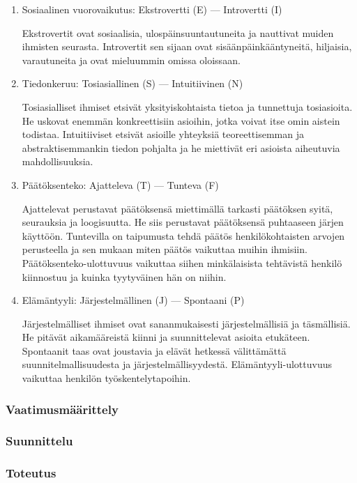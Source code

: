 \documentclass[finnish]{../tktltiki2}
\theoremstyle{definition}
\theoremstyle{remark}
\begin{document}
\begin{enumerate}

\item Sosiaalinen vuorovaikutus: Ekstrovertti (E) --- Introvertti (I)

Ekstrovertit ovat sosiaalisia, ulospäinsuuntautuneita ja nauttivat
muiden ihmisten seurasta. Introvertit sen sijaan ovat sisäänpäinkääntyneitä, hiljaisia, varautuneita ja ovat mieluummin omissa oloissaan.

\item Tiedonkeruu: Tosiasiallinen (S) --- Intuitiivinen (N)

Tosiasialliset ihmiset etsivät yksityiskohtaista tietoa ja tunnettuja
tosiasioita. He uskovat enemmän konkreettisiin asioihin, jotka
voivat itse omin aistein todistaa. Intuitiiviset etsivät asioille
yhteyksiä teoreettisemman ja abstraktisemmankin tiedon pohjalta ja
he miettivät eri asioista aiheutuvia mahdollisuuksia.

\item Päätöksenteko: Ajatteleva (T) --- Tunteva (F)

Ajattelevat perustavat päätöksensä miettimällä tarkasti päätöksen syitä, seurauksia ja loogisuutta. He siis perustavat päätöksensä puhtaaseen järjen käyttöön. Tuntevilla on taipumusta tehdä päätös
henkilökohtaisten arvojen perusteella ja sen mukaan miten päätös
vaikuttaa muihin ihmisiin. Päätöksenteko-ulottuvuus vaikuttaa siihen minkälaisista tehtävistä
henkilö kiinnostuu ja kuinka tyytyväinen hän on niihin.

\item Elämäntyyli: Järjestelmällinen (J) --- Spontaani (P)

Järjestelmälliset ihmiset ovat sananmukaisesti järjestelmällisiä
ja täsmällisiä. He pitävät aikamääreistä kiinni ja suunnittelevat
asioita etukäteen. Spontaanit taas ovat joustavia ja elävät
hetkessä välittämättä suunnitelmallisuudesta ja järjestelmällisyydestä.
Elämäntyyli-ulottuvuus vaikuttaa henkilön työskentelytapoihin.

\end{enumerate}

\subsubsection{Vaatimusmäärittely}
\subsubsection{Suunnittelu}
\subsubsection{Toteutus}
\end{document}
